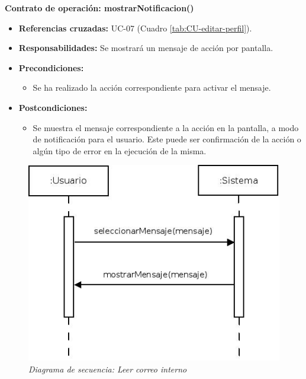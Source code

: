 \textbf{Contrato de operación: mostrarNotificacion()}
\begin{itemize}
\item \textbf{Referencias cruzadas:} UC-07 (Cuadro \ref{tab:CU-editar-perfil}).
\item \textbf{Responsabilidades:} Se mostrará un mensaje de acción por pantalla.
\item \textbf{Precondiciones:} 
 \begin{itemize}
\item Se ha realizado la acción correspondiente para activar el mensaje.
\end {itemize}
\item \textbf{Postcondiciones:} 
 \begin{itemize}
\item Se muestra el mensaje correspondiente a la acción en la pantalla, a modo de notificación para el usuario. Este puede ser confirmación de la acción o algún tipo de error en la ejecución de la misma.
\end {itemize}
\end {itemize}


\vspace{10mm}

\begin{figure}[H]
\centering
  \includegraphics[scale=.55]{img/secuencias/gestion-servicios-leer-correo.jpeg}
  \caption{\textit{Diagrama de secuencia: Leer correo interno}}
  \label{fig:secuencia-gestion-servicios-leer-correo}
\end{figure}

